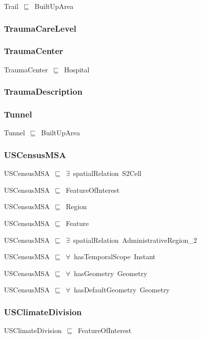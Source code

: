 \documentclass{article}
\begin{document}
Trail~\ensuremath{\sqsubseteq}~BuiltUpArea~

\subsubsection*{TraumaCareLevel}

\subsubsection*{TraumaCenter}

TraumaCenter~\ensuremath{\sqsubseteq}~Hospital~

\subsubsection*{TraumaDescription}

\subsubsection*{Tunnel}

Tunnel~\ensuremath{\sqsubseteq}~BuiltUpArea~

\subsubsection*{USCensusMSA}

USCensusMSA~\ensuremath{\sqsubseteq}~\ensuremath{\exists}~spatialRelation~S2Cell~

USCensusMSA~\ensuremath{\sqsubseteq}~FeatureOfInterest~

USCensusMSA~\ensuremath{\sqsubseteq}~Region~

USCensusMSA~\ensuremath{\sqsubseteq}~Feature~

USCensusMSA~\ensuremath{\sqsubseteq}~\ensuremath{\exists}~spatialRelation~AdministrativeRegion\_2~

USCensusMSA~\ensuremath{\sqsubseteq}~\ensuremath{\forall}~hasTemporalScope~Instant~

USCensusMSA~\ensuremath{\sqsubseteq}~\ensuremath{\forall}~hasGeometry~Geometry~

USCensusMSA~\ensuremath{\sqsubseteq}~\ensuremath{\forall}~hasDefaultGeometry~Geometry~

\subsubsection*{USClimateDivision}

USClimateDivision~\ensuremath{\sqsubseteq}~FeatureOfInterest~
\end{document}
